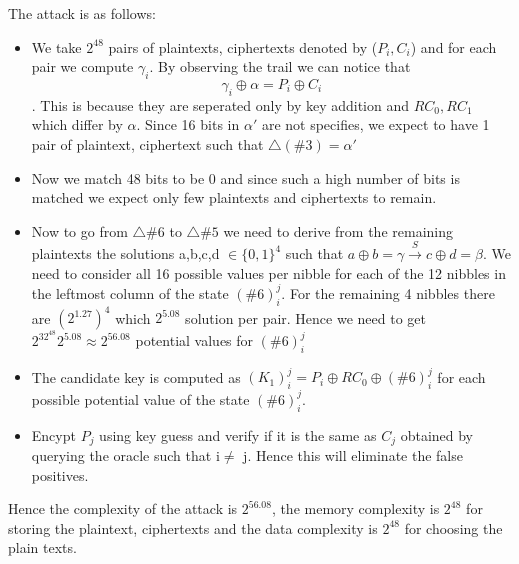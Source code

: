 \documentclass{transcrypto}
\begin{document}
The attack is as follows:\\
\begin{itemize}
    \item We take $2^{48}$ pairs of plaintexts, ciphertexts denoted by ($P_i,C_i$) and for each pair we compute $\gamma_i$. By observing the trail we can notice that \begin{equation*}
        \gamma_i \oplus \alpha = P_i \oplus C_i
    \end{equation*}. This is because they are seperated only by key addition and $RC_0,RC_1$ which differ by $\alpha$. Since 16 bits in $\alpha '$ are not specifies, we expect to have 1 pair of plaintext, ciphertext such that $\triangle(\#3)=\alpha '$
    \item Now we match 48 bits to be 0 and since such a high number of bits is matched we expect only few plaintexts and ciphertexts to remain.\\
    \item Now to go from $\triangle \#6$ to $\triangle \#5$ we need to derive from the remaining plaintexts the solutions a,b,c,d $\in \{0,1\}^4$ such that $a\oplus b =\gamma \xrightarrow{S} c \oplus d = \beta$. We need to consider all 16 possible values per nibble for each of the 12 nibbles in the leftmost column of the state $(\#6)_i^j$. For the remaining 4 nibbles there are $(2^{1.27})^4$ which $2^{5.08}$ solution per pair. Hence we need to get $2^32^{48}2^{5.08}\approx 2^{56.08}$ potential values for $(\#6)_i^j$
    \item The candidate key is computed as $(K_1)_i^j=P_i\oplus RC_0\oplus(\#6)_i^j$ for each possible potential value of the state $(\#6)_i^j$.
    \item Encypt $P_j$ using key guess and verify if it is the same as $C_j$ obtained by querying the oracle such that i$\neq$ j. Hence this will eliminate the false positives.
\end{itemize}
Hence the complexity of the attack is $2^{56.08}$, the memory complexity is $2^{48}$ for storing the plaintext, ciphertexts and the data complexity is $2^{48}$ for choosing the plain texts.
\end{document}
